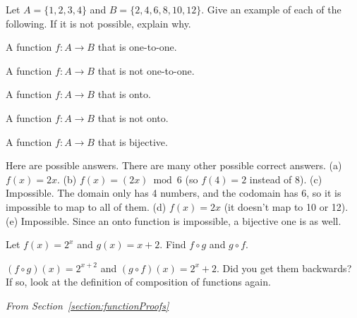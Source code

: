 \begin{requ}
Let $A=\{1,2,3,4\}$ and $B=\{2,4,6,8,10,12\}$.
Give an example of each of the following. If it is not possible, explain why.
\begin{lenum}
\item A function $f:A\rightarrow B$ that is one-to-one.
\item A function $f:A\rightarrow B$ that is not one-to-one.
\item A function $f:A\rightarrow B$ that is onto.
\item A function $f:A\rightarrow B$ that is not onto.
\item A function $f:A\rightarrow B$ that is bijective.
\end{lenum}
\begin{requanswer}
Here are possible answers. There are many other possible correct answers.
(a) $f(x)=2x$.
(b) $f(x)=(2x)\bmod 6$ (so $f(4)=2$ instead of 8).
(c) Impossible. The domain only has 4 numbers, and the codomain has 6, so it is impossible to map to all of them.
(d) $f(x)=2x$ (it doesn't map to 10 or 12).
(e) Impossible. Since an onto function is impossible, a bijective one is as well.
\end{requanswer}
\end{requ}

\begin{requ}
Let $f(x)=2^x$ and $g(x)=x+2$. Find $f\circ g$ and $g\circ f$.
\begin{requanswer}
$(f\circ g)(x)=2^{x+2}$ and $(g\circ f)(x)=2^x+2$.
Did you get them backwards? If so, look at the definition of composition of functions again.
\end{requanswer}
\end{requ}

\medskip
\noindent
{\em From Section~\ref{section:functionProofs}}

